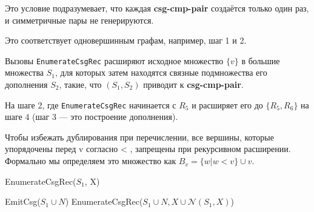 \documentclass[12pt]{article}
\begin{document}
\begin{flushleft}
Это условие подразумевает, что каждая \textbf{csg-cmp-pair} создаётся только один раз,  
и симметричные пары не генерируются.  

Это соответствует одновершинным графам, например, шаг 1 и 2.

Вызовы \texttt{EnumerateCsgRec} расширяют исходное множество $\{v\}$  
в большие множества $S_1$, для которых затем находятся связные подмножества  
его дополнения $S_2$, такие, что $(S_1, S_2)$ приводит к \textbf{csg-cmp-pair}.  

На шаге 2, где \texttt{EnumerateCsgRec} начинается с $R_5$  
и расширяет его до $\{R_5, R_6\}$ на шаге 4  
(шаг 3 — это построение дополнения).

\begin{center}
\end{center}

Чтобы избежать дублирования при перечислении, все вершины, которые 
упорядочены перед v согласно < , запрещены при рекурсивном 
расширении. Формально мы определяем это множество как $B_v = \{w | w < v\} \cup {v}$.

\begin{algorithm}
    EnumerateCsgRec($S_1$, X)
    \begin{algorithmic}[1]
                \State EmitCsg($S_1 \cup N$)
            \EndIf
        \EndFor
            \State EnumerateCsgRec($S_1 \cup N,X \cup \mathcal{N}(S_1, X)$)
        \EndFor
    \end{algorithmic}
\end{algorithm}


\end{flushleft}
\end{document}

